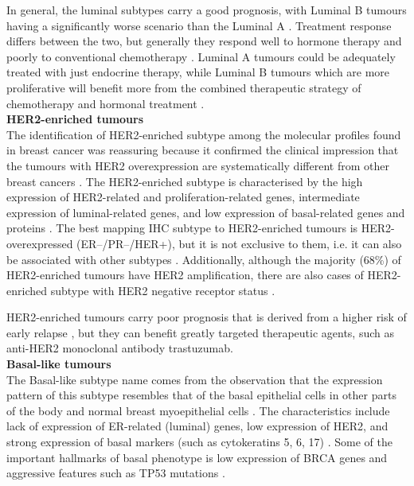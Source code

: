 In general, the luminal subtypes carry a good prognosis, with Luminal B tumours having a significantly worse scenario than the Luminal A \cite{Srlie2003RepeatedSets}. Treatment response differs between the two, but generally they respond well to hormone therapy and poorly to conventional chemotherapy \cite{brenton2005molecular}. Luminal A tumours could be adequately treated with just endocrine therapy, while Luminal B tumours which are more proliferative will benefit more from the combined therapeutic strategy of chemotherapy and hormonal treatment \cite{paik2004multigene}.\\


\textbf{HER2-enriched tumours}\\
The identification of HER2-enriched subtype among the molecular profiles found in breast cancer was reassuring because it confirmed the clinical impression that the tumours with HER2 overexpression are systematically different from other breast cancers \cite{brenton2005molecular}. 
The HER2-enriched subtype is characterised by the high expression of HER2-related and proliferation-related genes, intermediate expression of luminal-related genes, and low expression of basal-related genes and proteins \cite{Vidal2017}. The best mapping IHC subtype to HER2-enriched tumours is HER2-overexpressed  (ER--/PR--/HER+), but it is not exclusive to them, i.e. it can also be associated with other subtypes \cite{Dai2015}. Additionally, although the majority (68\%) of HER2-enriched tumours have HER2 amplification, there are also cases of HER2-enriched subtype with HER2 negative receptor status \cite{Vidal2017}.

HER2-enriched tumours carry poor prognosis that is derived from a higher risk of early relapse \cite{carey2007triple}, but they can benefit greatly targeted therapeutic agents, such as anti-HER2 monoclonal antibody trastuzumab. \\

\newpage
\textbf{Basal-like tumours}\\
The Basal-like subtype name comes from the observation that the expression pattern of this subtype resembles that of the basal epithelial cells in other parts of the body and normal breast myoepithelial cells \cite{perou2000molecular, brenton2005molecular}. The characteristics include lack of expression of ER-related (luminal) genes, low expression of HER2, and strong expression of basal markers (such as cytokeratins 5, 6, 17) \cite{sotiriou2003breast}. Some of the important hallmarks of basal phenotype is low expression of BRCA genes \cite{callagy2003molecular} and aggressive features such as TP53 mutations \cite{Srlie2001GeneImplications}. 

